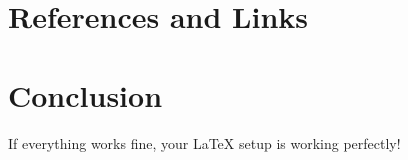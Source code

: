 \documentclass[11pt, a4paper]{scrartcl}
\begin{document}
\section{References and Links}

\section{Conclusion}
If everything works fine, your LaTeX setup is working perfectly!
\end{document}

